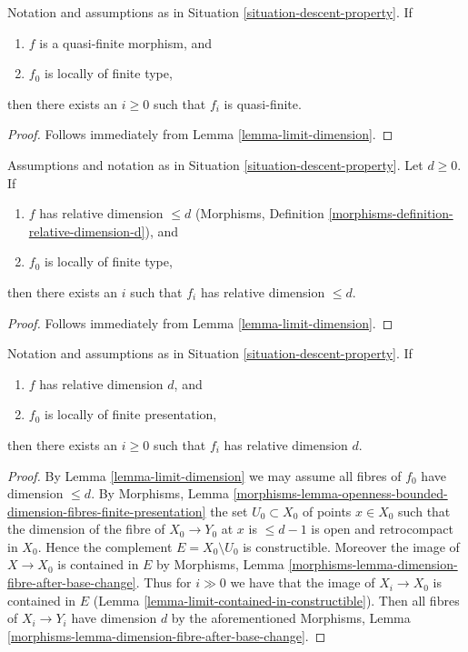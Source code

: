 \begin{lemma}
\label{lemma-descend-quasi-finite}
Notation and assumptions as in Situation \ref{situation-descent-property}.
If
\begin{enumerate}
\item $f$ is a quasi-finite morphism, and
\item $f_0$ is locally of finite type,
\end{enumerate}
then there exists an $i \geq 0$ such that $f_i$ is quasi-finite.
\end{lemma}

\begin{proof}
Follows immediately from Lemma \ref{lemma-limit-dimension}.
\end{proof}

\begin{lemma}
\label{lemma-eventually-relative-dimension}
Assumptions and notation as in Situation \ref{situation-descent-property}.
Let $d \geq 0$. If
\begin{enumerate}
\item $f$ has relative dimension $\leq d$
(Morphisms, Definition \ref{morphisms-definition-relative-dimension-d}), and
\item $f_0$ is locally of finite type,
\end{enumerate}
then there exists an $i$ such that $f_i$ has relative dimension $\leq d$.
\end{lemma}

\begin{proof}
Follows immediately from Lemma \ref{lemma-limit-dimension}.
\end{proof}

\begin{lemma}
\label{lemma-descend-dimension-d}
Notation and assumptions as in Situation \ref{situation-descent-property}.
If
\begin{enumerate}
\item $f$ has relative dimension $d$, and
\item $f_0$ is locally of finite presentation,
\end{enumerate}
then there exists an $i \geq 0$ such that $f_i$
has relative dimension $d$.
\end{lemma}

\begin{proof}
By Lemma \ref{lemma-limit-dimension} we may assume all fibres
of $f_0$ have dimension $\leq d$. By Morphisms, Lemma
\ref{morphisms-lemma-openness-bounded-dimension-fibres-finite-presentation}
the set $U_0 \subset X_0$ of points $x \in X_0$ such that
the dimension of the fibre of $X_0 \to Y_0$ at $x$ is $\leq d - 1$
is open and retrocompact in $X_0$. Hence the complement
$E = X_0 \setminus U_0$ is constructible.
Moreover the image of $X \to X_0$ is contained in $E$
by Morphisms, Lemma \ref{morphisms-lemma-dimension-fibre-after-base-change}.
Thus for $i \gg 0$ we have that the image
of $X_i \to X_0$ is contained in $E$
(Lemma \ref{lemma-limit-contained-in-constructible}). Then all fibres
of $X_i \to Y_i$ have dimension $d$ by the aforementioned
Morphisms, Lemma \ref{morphisms-lemma-dimension-fibre-after-base-change}.
\end{proof}

